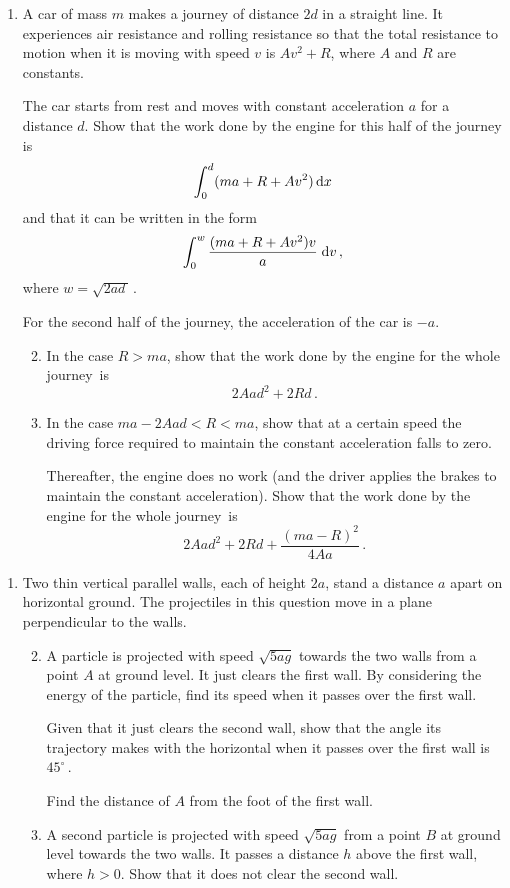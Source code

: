 \documentclass[a4, 11pt]{report}
\newlength{\qspace}
\newcounter{qnumber}
\newenvironment{question}%
 {\vspace{\qspace}
  \begin{enumerate}[\bfseries 1\quad][10]%
    \setcounter{enumi}{\value{qnumber}}%
    \item%
 }
{
  \end{enumerate}
  \filbreak
  \stepcounter{qnumber}
 }
\newenvironment{questionparts}[1][1]%
 {
  \begin{enumerate}[\bfseries (i)]%
    \setcounter{enumii}{#1}
    \addtocounter{enumii}{-1}
    \setlength{\itemsep}{2mm}
    \setlength{\parskip}{5pt}
 }
 {
  \end{enumerate}
 }
\def\d{{\rm d}}
\begin{document}
\begin{question}
A car of mass $m$ makes a journey of  distance $2d$ 
in  a straight line. 
It  experiences air resistance  and rolling resistance
so that the total resistance to motion when it is moving with 
speed $v$ is $Av^2 +R$, where $A$ and $R$ are constants.


The car starts from rest and 
moves with constant acceleration $a$ for a distance $d$.
Show that the work done by the engine 
for this half of the journey 
is
\[
\int_0^d  (ma+R+Av^2) \, \d x
\]
and that it can be written 
in the form
\[
\int_0^w \frac {(ma+R+Av^2)v}a\;  \d v
\,,
\]
where $w =\sqrt {2ad\,}\,$.

For the second half of the journey, the acceleration of 
the car is $-a$. 



\begin{questionparts}
\item
In the case $R>ma$, 
show that the work done by the  
engine for the whole  journey~is 
\[
2Aad^2 +  2Rd
\,.
\]

\item
In the case $ma-2Aad<   R<   ma$, show that  at a certain speed 
  the driving
force required to maintain the constant acceleration
falls to zero. 

Thereafter, the engine does no work
(and the driver applies the brakes to maintain
the constant acceleration).
Show that the  work done by the engine for the whole journey~is  
\[
 2Aad^2 + 2 Rd
 + \frac{(ma-R)^2}{4Aa} 
\,
.\]


\end{questionparts}
\end{question}



\begin{question}
Two thin vertical parallel
walls, each of height $2a$, stand a distance $a$ apart
on horizontal ground.
The projectiles in this
question move in a plane perpendicular to the walls.

\begin{questionparts}
\item
A particle is projected with speed $\sqrt{5ag}$
towards the two
walls 
 from a point $ A$ at ground level.
It just clears the first wall. By considering the energy
of the particle, find its 
speed when it passes over the first wall.

Given that it just clears the second wall, 
show that
the angle 
its trajectory makes with the horizontal when it 
passes over the first wall 
is $45^\circ\,$.

 
Find the distance of $A$ from the foot of the first wall.

\item 
A second particle is projected with  speed $\sqrt{5ag}$
 from a point $B$ at ground level towards the two
walls. It passes a distance $h$ above the first wall, where $h>0$. 
Show that it does not clear the second wall.  

\end{questionparts}
\end{question}
\end{document}
